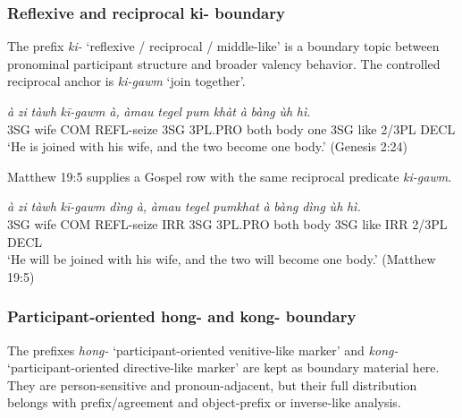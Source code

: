 \documentclass[
  11pt,
  a4paper,
]{article}
\newcommand{\tdim}[1]{\textit{#1}}
\newcommand{\tdimword}[1]{\textit{#1}}
\renewcommand{\textsc}[1]{{\footnotesize\MakeUppercase{#1}}}
\newcommand{\glossquote}[1]{`#1'}
\begin{document}
\subsubsection{Reflexive and reciprocal ki-
boundary}\label{reflexive-and-reciprocal-ki--boundary}

The prefix \tdim{ki-} \glossquote{reflexive / reciprocal / middle-like}
is a boundary topic between pronominal participant structure and broader
valency behavior. The controlled reciprocal anchor is \tdim{ki-gawm}
\glossquote{join together}.

\begin{exe}
\ex \label{ex:refl-ki}
\gll \tdimword{à} \tdimword{zi} \tdimword{tàwh} \tdimword{kī-gawm} \tdimword{à,} \tdimword{àmau} \tdimword{tegel} \tdimword{pum} \tdimword{khàt} \tdimword{à} \tdimword{bàng} \tdimword{ùh} \tdimword{hì.} \\
     \textsc{3sg} wife \textsc{com} \textsc{refl}-seize \textsc{3sg} \textsc{3pl}.\textsc{pro} both body one \textsc{3sg} like 2/3PL \textsc{decl} \\
\glt \glossquote{He is joined with his wife, and the two become one body.} (Genesis 2:24)
\end{exe}

Matthew 19:5 supplies a Gospel row with the same reciprocal predicate
\tdim{ki-gawm}.

\begin{exe}
\ex \label{ex:refl-ki-matt19}
\gll \tdimword{à} \tdimword{zi} \tdimword{tàwh} \tdimword{kī-gawm} \tdimword{dìng} \tdimword{à,} \tdimword{àmau} \tdimword{tegel} \tdimword{pumkhat} \tdimword{à} \tdimword{bàng} \tdimword{dìng} \tdimword{ùh} \tdimword{hì.} \\
     \textsc{3sg} wife \textsc{com} \textsc{refl}-seize \textsc{irr} \textsc{3sg} \textsc{3pl}.\textsc{pro} both body \textsc{3sg} like \textsc{irr} 2/3PL \textsc{decl} \\
\glt \glossquote{He will be joined with his wife, and the two will become one body.} (Matthew 19:5)
\end{exe}

\subsubsection{Participant-oriented hong- and kong-
boundary}\label{participant-oriented-hong--and-kong--boundary}

The prefixes \tdim{hong-}
\glossquote{participant-oriented venitive-like marker} and \tdim{kong-}
\glossquote{participant-oriented directive-like marker} are kept as
boundary material here. They are person-sensitive and pronoun-adjacent,
but their full distribution belongs with prefix/agreement and
object-prefix or inverse-like analysis.
\end{document}
